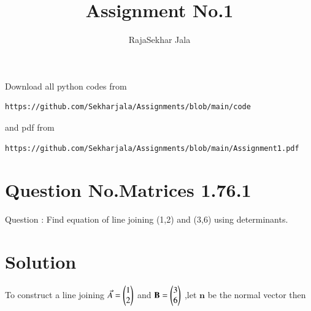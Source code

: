 \documentclass[journal,12pt,twocolumn]{IEEEtran}
\begin{document}
\makeatother
\let\StandardTheFigure\thefigure
\let\vec\mathbf
\renewcommand{\thefigure}{\theproblem}
\def\putbox#1#2#3{\makebox[0in][l]{\makebox[#1][l]{}\raisebox{\baselineskip}[0in][0in]{\raisebox{#2}[0in][0in]{#3}}}}
     \def\rightbox#1{\makebox[0in][r]{#1}}
     \def\centbox#1{\makebox[0in]{#1}}
     \def\topbox#1{\raisebox{-\baselineskip}[0in][0in]{#1}}
     \def\midbox#1{\raisebox{-0.5\baselineskip}[0in][0in]{#1}}
\vspace{3cm}
\title{Assignment No.1}
\author{RajaSekhar Jala}
\maketitle
\newpage
\bigskip
\renewcommand{\thefigure}{\theenumi}
\renewcommand{\thetable}{\theenumi}
Download all python codes from 
\begin{lstlisting}
https://github.com/Sekharjala/Assignments/blob/main/code
\end{lstlisting}
%
and pdf from 
%
\begin{lstlisting}
https://github.com/Sekharjala/Assignments/blob/main/Assignment1.pdf
\end{lstlisting}
%
\section{Question No.Matrices 1.76.1}
Question :
Find equation of line joining (1,2) and
(3,6) using determinants.
\section{Solution}
To construct a line joining $\Vec{A}=\begin{pmatrix}1\\2\end{pmatrix}$ and $\vec{B}=\myvec{3\\6}$ ,let $\vec{n}$ be the normal vector then
\end{document}
